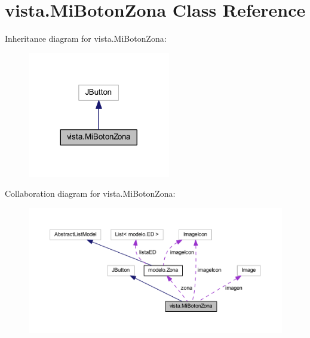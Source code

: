 \hypertarget{classvista_1_1_mi_boton_zona}{}\section{vista.\+Mi\+Boton\+Zona Class Reference}
\label{classvista_1_1_mi_boton_zona}


Inheritance diagram for vista.\+Mi\+Boton\+Zona\+:
\nopagebreak
\begin{figure}[H]
\begin{center}
\leavevmode
\includegraphics[width=176pt]{classvista_1_1_mi_boton_zona__inherit__graph}
\end{center}
\end{figure}


Collaboration diagram for vista.\+Mi\+Boton\+Zona\+:
\nopagebreak
\begin{figure}[H]
\begin{center}
\leavevmode
\includegraphics[width=350pt]{classvista_1_1_mi_boton_zona__coll__graph}
\end{center}
\end{figure}
